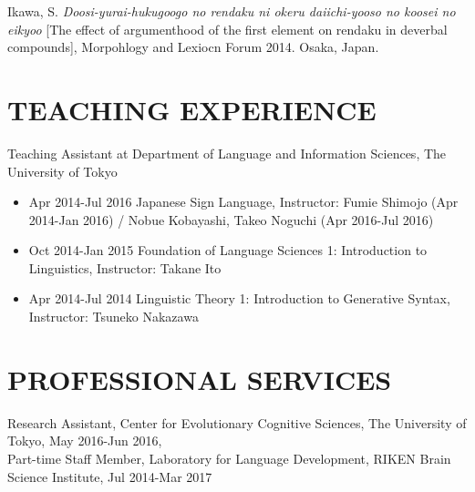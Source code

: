 \documentclass[margin, 12pt]{article} %
\begin{document}
Ikawa, S. {\sl Doosi-yurai-hukugoogo no rendaku ni okeru daiichi-yooso no koosei no eikyoo} [The effect of argumenthood of the first element on rendaku in deverbal compounds], Morpohlogy and Lexiocn Forum 2014. Osaka, Japan.




\section*{TEACHING EXPERIENCE}
Teaching Assistant at Department of Language and Information Sciences, The University of Tokyo
\begin{itemize}
\item Apr 2014-Jul 2016 Japanese Sign Language, Instructor: Fumie Shimojo (Apr 2014-Jan 2016) / Nobue Kobayashi, Takeo Noguchi (Apr 2016-Jul 2016)
\item Oct 2014-Jan 2015 Foundation of Language Sciences 1: Introduction to Linguistics, Instructor: Takane Ito
\item Apr 2014-Jul 2014 Linguistic Theory 1: Introduction to Generative Syntax, Instructor: Tsuneko Nakazawa
\end{itemize}



\section*{PROFESSIONAL SERVICES} 
Research Assistant, Center for Evolutionary Cognitive Sciences, The University of Tokyo, May 2016-Jun 2016,\\

Part-time Staff Member, Laboratory for Language Development, RIKEN Brain Science Institute, Jul 2014-Mar 2017

\end{document}
